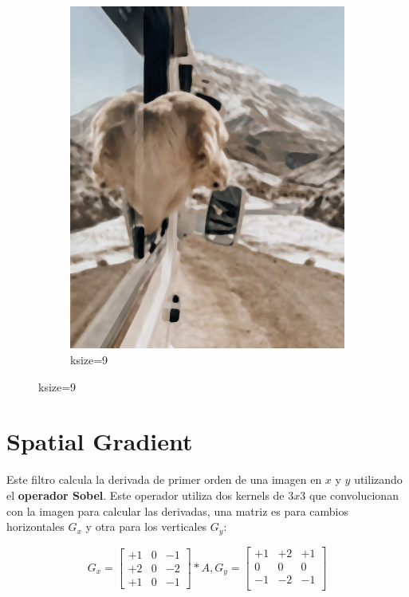 \documentclass[a4paper, 12pt]{article}
\begin{document}
\begin{figure}[!ht]
\begin{subfigure}{0.4\textwidth}
        \includegraphics[width=\textwidth]{img/dog-median.png}
        \caption{ksize=9}
    \end{subfigure}
\end{figure}

\section{Spatial Gradient}
Este filtro calcula la derivada de primer orden de una imagen en $x$ y $y$ utilizando el \textbf{operador Sobel}. Este operador utiliza dos kernels de $3x3$ que convolucionan con la imagen para calcular las derivadas, una matriz es para cambios horizontales $G_x$ y otra para los verticales $G_y$:

\begin{equation}
    G_x
    =
    \begin{bmatrix}
        +1 & 0 & -1 \\
        +2 & 0 & -2 \\
        +1 & 0 & -1
    \end{bmatrix}
    *
    A,
    G_y
    =
    \begin{bmatrix}
        +1 & +2 & +1 \\
        0  & 0  & 0  \\
        -1 & -2 & -1 \\
    \end{bmatrix}
\end{equation}
\end{document}

